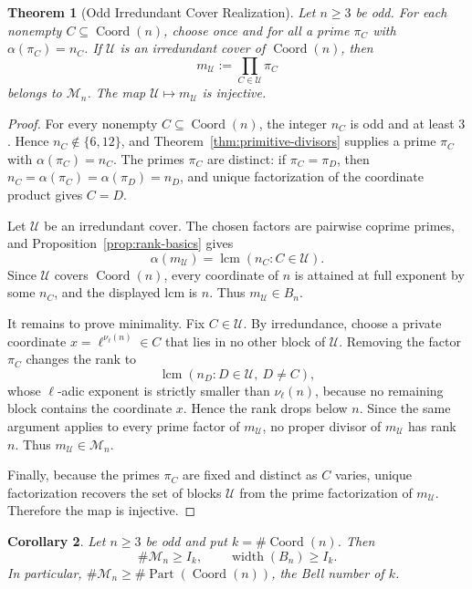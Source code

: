 \documentclass[11pt,letterpaper]{article}
\numberwithin{equation}{section}
\theoremstyle{plain}
\newtheorem{theorem}{Theorem}[section]
\newtheorem{corollary}[theorem]{Corollary}
\theoremstyle{definition}
\theoremstyle{remark}
\DeclareMathOperator{\lcmop}{lcm}
\DeclareMathOperator{\widthop}{width}
\DeclareMathOperator{\Part}{Part}
\DeclareMathOperator{\Coord}{Coord}
\begin{document}
\begin{theorem}[Odd Irredundant Cover Realization]
\label{thm:odd-irredundant-cover-realization}
Let \(n\ge3\) be odd. For each nonempty \(C\subseteq\Coord(n)\), choose once and
for all a prime \(\pi_C\) with \(\alpha(\pi_C)=n_C\). If \(\mathcal U\) is an
irredundant cover of \(\Coord(n)\), then
\[
m_{\mathcal U}:=\prod_{C\in\mathcal U}\pi_C
\]
belongs to \(\mathcal M_n\). The map
\(\mathcal U\mapsto m_{\mathcal U}\) is injective.
\end{theorem}

\begin{proof}
For every nonempty \(C\subseteq\Coord(n)\), the integer \(n_C\) is odd and at
least \(3\). Hence \(n_C\notin\{6,12\}\), and
Theorem~\ref{thm:primitive-divisors} supplies a prime \(\pi_C\) with
\(\alpha(\pi_C)=n_C\). The primes \(\pi_C\) are distinct: if
\(\pi_C=\pi_D\), then \(n_C=\alpha(\pi_C)=\alpha(\pi_D)=n_D\), and unique
factorization of the coordinate product gives \(C=D\).

Let \(\mathcal U\) be an irredundant cover. The chosen factors are pairwise
coprime primes, and Proposition~\ref{prop:rank-basics} gives
\[
\alpha(m_{\mathcal U})=
\lcmop(n_C:C\in\mathcal U).
\]
Since \(\mathcal U\) covers \(\Coord(n)\), every coordinate of \(n\) is attained
at full exponent by some \(n_C\), and the displayed lcm is \(n\). Thus
\(m_{\mathcal U}\in B_n\).

It remains to prove minimality. Fix \(C\in\mathcal U\). By irredundance, choose
a private coordinate \(x=\ell^{\nu_\ell(n)}\in C\) that lies in no other block
of \(\mathcal U\). Removing the factor \(\pi_C\) changes the rank to
\[
\lcmop(n_D:D\in\mathcal U,\ D\ne C),
\]
whose \(\ell\)-adic exponent is strictly smaller than \(\nu_\ell(n)\), because
no remaining block contains the coordinate \(x\). Hence the rank drops below
\(n\). Since the same argument applies to every prime factor of
\(m_{\mathcal U}\), no proper divisor of \(m_{\mathcal U}\) has rank \(n\).
Thus \(m_{\mathcal U}\in\mathcal M_n\).

Finally, because the primes \(\pi_C\) are fixed and distinct as \(C\) varies,
unique factorization recovers the set of blocks \(\mathcal U\) from the prime
factorization of \(m_{\mathcal U}\). Therefore the map is injective.
\end{proof}

\begin{corollary}\label{cor:odd-cover-lower-bounds}
Let \(n\ge3\) be odd and put \(k=\#\Coord(n)\). Then
\[
\#\mathcal M_n\ge I_k,
\qquad
\widthop(B_n)\ge I_k.
\]
In particular, \(\#\mathcal M_n\ge \#\Part(\Coord(n))\), the Bell number of
\(k\).
\end{corollary}
\end{document}
